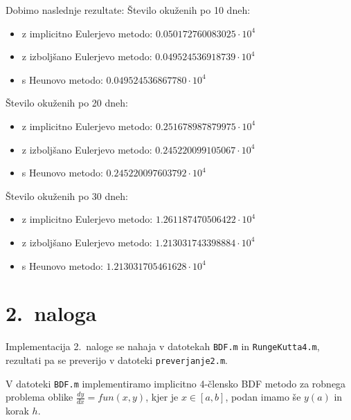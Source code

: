 \documentclass[a4paper,12pt]{article}
\begin{document}
Dobimo naslednje rezultate:
Število okuženih po 10 dneh:
\begin{itemize}
    \item z implicitno Eulerjevo metodo: $0.050172760083025 \cdot 10^4$
    \item z izboljšano Eulerjevo metodo: $0.049524536918739 \cdot 10^4$
    \item s Heunovo metodo: $0.049524536867780 \cdot 10^4$
\end{itemize}

Število okuženih po 20 dneh:
\begin{itemize}
    \item z implicitno Eulerjevo metodo: $0.251678987879975 \cdot 10^4$
    \item z izboljšano Eulerjevo metodo: $0.245220099105067 \cdot 10^4$
    \item s Heunovo metodo: $0.245220097603792 \cdot 10^4$
\end{itemize}

Število okuženih po 30 dneh:
\begin{itemize}
    \item z implicitno Eulerjevo metodo: $1.261187470506422 \cdot 10^4$
    \item z izboljšano Eulerjevo metodo: $1.213031743398884 \cdot 10^4$
    \item s Heunovo metodo: $1.213031705461628 \cdot 10^4$
\end{itemize}

\section*{2.\ naloga}

Implementacija 2.\ naloge se nahaja v datotekah 
\texttt{BDF.m} in \texttt{RungeKutta4.m}, rezultati pa se preverijo 
v datoteki \texttt{preverjanje2.m}.

V datoteki \texttt{BDF.m} implementiramo implicitno 4-člensko BDF
metodo za robnega problema oblike 
\(\frac{dy}{dx}=fun(x,y)\), kjer je \(x\in [a,b]\), podan imamo še \(y(a)\) in korak \(h\).
\end{document}
